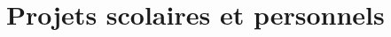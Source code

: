 \documentclass[letterpaper]{twentysecondcv} %
\begin{document}

\vspace{-0.1cm} %



\section{Projets scolaires et personnels}
\vspace{-0.15cm}
\end{document}
